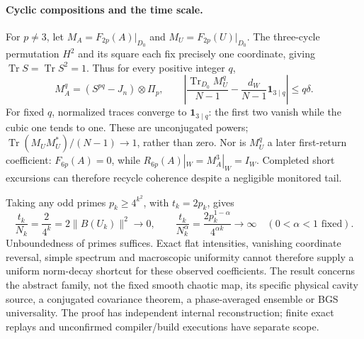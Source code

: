 \paragraph{Cyclic compositions and the time scale.}
For \(p\ne3\), let \(M_A=F_{2p}(A)|_{D_0}\) and
\(M_U=F_{2p}(U)|_{D_0}\).
The three-cycle permutation \(H^2\) and its square each fix precisely
one coordinate, giving \(\operatorname{Tr}S=\operatorname{Tr}S^2=1\).
Thus for every positive integer \(q\),
\[
 M_A^q=(S^{pq}-J_n)\otimes\Pi_p,\qquad
 \left|\frac{\operatorname{Tr}_{D_0}M_U^q}{N-1}
 -\frac{d_W}{N-1}\mathbf{1}_{3\mid q}\right|\le q\delta.
\]
For fixed \(q\), normalized traces converge to
\(\mathbf{1}_{3\mid q}\): the first two vanish while the cubic one
tends to one. These are unconjugated powers;
\(\operatorname{Tr}(M_UM_U^*)/(N-1)\to1\), rather than zero.
Nor is \(M_U^q\) a later first-return coefficient:
\(F_{6p}(A)=0\), while \(R_{6p}(A)|_W=M_A^3|_W=I_W\).
Completed short excursions can therefore recycle coherence despite
a negligible monitored tail.

Taking any odd primes \(p_k\ge4^{k^2}\), with \(t_k=2p_k\), gives
\[
 \frac{t_k}{N_k}=\frac2{4^k}=2\|B(U_k)\|^2\longrightarrow0,
 \qquad
 \frac{t_k}{N_k^\alpha}
    =\frac{2p_k^{1-\alpha}}{4^{\alpha k}}\longrightarrow\infty
       \quad(0<\alpha<1\text{ fixed}).
\]
Unboundedness of primes suffices. Exact flat intensities, vanishing
coordinate reversal, simple spectrum and macroscopic uniformity
cannot therefore supply a uniform norm-decay shortcut for these
observed coefficients. The result concerns the abstract family,
not the fixed smooth chaotic map, its specific physical cavity
source, a conjugated covariance theorem, a phase-averaged ensemble
or BGS universality. The proof has independent internal reconstruction;
finite exact replays and unconfirmed compiler/build executions have
separate scope.
